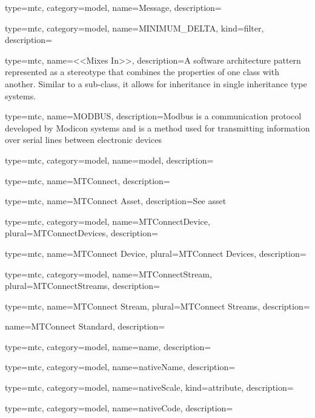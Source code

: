 {
  type=mtc,
  category=model,
  name={Message},
  description={}
}


{
  type=mtc,
  category=model,
  name={MINIMUM\_DELTA},
  kind={filter},
  description={}
}


{
  type=mtc,
  name={<<Mixes In>>},
  description={A software architecture pattern represented as a \gls{stereotype} that combines the properties of one class with another. Similar to a sub-class, it allows for inheritance in single inheritance type systems.}
}


{
  type=mtc,
  name=MODBUS,
  description={Modbus is a communication protocol developed by Modicon systems and is a method used for transmitting information over serial lines between electronic devices}
}


{
  type=mtc,
  category=model,
  name={model},
  description={}
}


{
  type=mtc,
  name={MTConnect},
  description={}
}


{
  type=mtc,
  name={MTConnect Asset},
  description={See \gls{asset}}
}


{
  type=mtc,
  category=model,
  name={MTConnectDevice},
  plural={MTConnectDevices},
  description={}
}


{
  type=mtc,
  name={MTConnect Device},
  plural={MTConnect Devices},
  description={}
}


{
  type=mtc,
  category=model,
  name={MTConnectStream},
  plural={MTConnectStreams},
  description={}
}


{
  type=mtc,
  name={MTConnect Stream},
  plural={MTConnect Streams},
  description={}
}


{
  name={MTConnect Standard},
  description={}
}


{
  type=mtc,
  category=model,
  name={name},
  description={}
}


{
  type=mtc,
  category=model,
  name={nativeName},
  description={}
}


{
  type=mtc,
  category=model,
  name={nativeScale},
  kind={attribute},
  description={}
}


{
  type=mtc,
  category=model,
  name={nativeCode},
  description={}
}



